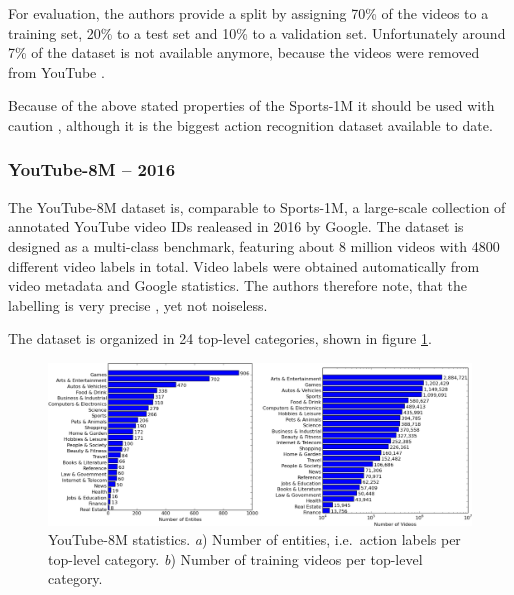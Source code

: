 For evaluation, the authors provide a split by assigning 70\% of the videos to a training set, 20\% to a test set and 10\% to a validation set.
Unfortunately around 7\% of the dataset is not available anymore, because the videos were removed from YouTube \cite{ng_beyond_2015}.

Because of the above stated properties of the Sports-1M it should be used with caution \cite{kang_review_2016}, although it is the biggest action recognition dataset available to date.

%

\subsubsection{YouTube-8M -- 2016}
The YouTube-8M dataset \cite{abu-el-haija_youtube-8m:_2016} is, comparable to Sports-1M, a large-scale collection of annotated YouTube video IDs realeased in 2016 by Google.
The dataset is designed as a multi-class benchmark, featuring about 8 million videos with 4800 different video labels in total.
Video labels were obtained automatically from video metadata and Google statistics.
The authors therefore note, that the labelling is very precise \cite{abu-el-haija_youtube-8m:_2016}, yet not noiseless.

The dataset is organized in 24 top-level categories, shown in figure \ref{fig:youtube8m_toplevel}.

\begin{figure}[H]
    \centering
    \includegraphics[width=\textwidth]{img_datasets/youtube8m_toplevel}
\caption{YouTube-8M statistics. \textit{a}) Number of entities, i.e.\ action labels per top-level category. \textit{b}) Number of training videos per top-level category. \cite{abu-el-haija_youtube-8m:_2016}}
    \label{fig:youtube8m_toplevel}
\end{figure}

